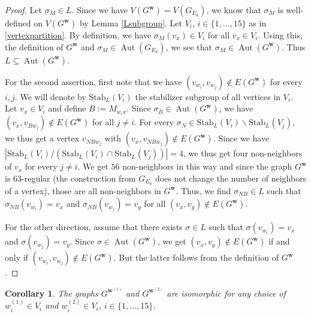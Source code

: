 \documentclass[11pt]{article}
\newtheorem{coro}[theo]{Corollary}
\theoremstyle{definition}
\numberwithin{equation}{section}
\DeclareMathOperator{\aut}{Aut}
\begin{document}
\begin{proof}
Let $\sigma_M \in L$. Since we have $V(G^{\boldsymbol{w}})=V(G_{E_8})$, we know that $\sigma_M $ is well-defined on $V(G^{\boldsymbol{w}})$ by Lemma \ref{Lsubgroup}. Let $V_i$, $i \in \{1, \dots, 15\}$ as in \eqref{vertexpartition}. By definition, we have $\sigma_M(v_x)\in V_i$ for all $v_x \in V_i$. Using this, the definition of $G^{\boldsymbol{w}}$ and $\sigma_M \in \aut(G_{E_8})$, we see that $\sigma_M \in \aut(G^{\boldsymbol{w}})$. Thus $L \subseteq \aut(G^{\boldsymbol{w}})$.

For the second assertion, first note that we have $(v_{w_i}, v_{w_j})\notin E(G^{\boldsymbol{w}})$ for every $i, j$.  We will denote by $\mathrm{Stab}_L(V_i)$ the stabilizer subgroup of all vertices in $V_i$. Let $v_x \in V_i$ and define $B:=M_{w_ix}$. Since $\sigma_{B}\in \aut(G^{\boldsymbol{w}})$, we have $(v_x, v_{Bw_j})\notin E(G^{\boldsymbol{w}})$ for all $j \neq i$. For every $\sigma_N\in \mathrm{Stab}_L(V_i)\backslash \mathrm{Stab}_L(V_j)$, we thus get a vertex $v_{NBw_j}$ with $(v_x, v_{NBw_j})\notin E(G^{\boldsymbol{w}})$. Since we have $|\mathrm{Stab}_L(V_i)/ (\mathrm{Stab}_L(V_i)\cap \mathrm{Stab}_L(V_j))|=4$, we thus get four non-neighbors of $v_x$ for every $j \neq i$. We get $56$ non-neighbors in this way and since the graph $G^{\boldsymbol{w}}$ is $63$-regular (the construction from $G_{E_8}$ does not change the number of neighbors of a vertex), those are all non-neighbors in $G^{\boldsymbol{w}}$. Thus, we find $\sigma_{NB}\in L$ such that $\sigma_{NB}(v_{w_i})=v_x$ and $\sigma_{NB}(v_{w_j})=v_y$ for all $(v_x,v_y)\notin E(G^{\boldsymbol{w}})$. 

For the other direction, assume that there exists $\sigma\in L$ such that $\sigma(v_{w_i})=v_x$ and $\sigma(v_{w_j})=v_y$. Since $\sigma \in \aut(G^{\boldsymbol{w}})$, we get $(v_x,v_y) \notin E(G^{\boldsymbol{w}})$ if and only if $(v_{w_i}, v_{w_j})\notin E(G^{\boldsymbol{w}})$. But the latter follows from the definition of $G^{\boldsymbol{w}}$.
\end{proof}

\begin{coro}
The graphs $G^{\boldsymbol{w}^{(1)}}$ and $G^{\boldsymbol{w}^{(2)}}$ are isomorphic for any choice of $w_i^{(1)}\in V_i$ and $w_i^{(2)}\in V_i$, $i\in \{1,\dots, 15\}$. 
\end{coro}
\end{document}
